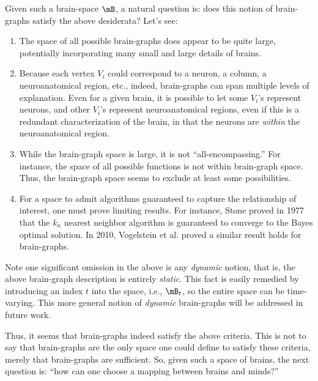Given such a brain-space $\mB$, a natural question is: does this notion of brain-graphs satisfy the above desiderata? Let's see:

\begin{enumerate}
	\item The space of all possible brain-graphs does appear to be quite large, potentially incorporating many small and large details of brains.
	\item Because each vertex $V_i$ could correspond to a neuron, a column, a neuroanatomical region, etc., indeed, brain-graphs can span multiple levels of explanation.  Even for a given brain, it is possible to let some $V_i$'s represent neurons, and other $V_i$'s represent neuroanatomical regions, even if this is a redundant characterization of the brain, in that the neurons are \emph{within} the neuroanatomical region.
	\item While the brain-graph space is large, it is not ``all-encompassing.''  For instance, the space of all possible functions is not within brain-graph space. Thus, the brain-graph space seems to exclude at least some possibilities.
	\item For a space to admit algorithms guaranteed to capture the relationship of interest, one must prove limiting results.  For instance, Stone proved in 1977 \cite{Stone77} that the $k_n$ nearest neighbor algorithm is guaranteed to converge to the Bayes optimal solution.  In 2010, Vogelstein et al. \cite{VogelsteinPriebe10} proved a similar result holds for brain-graphs.
\end{enumerate}

Note one significant omission in the above is any \emph{dynamic} notion, that is, the above brain-graph description is entirely \emph{static}\cite{?}.  This fact is easily remedied by introducing an index $t$ into the space, i.e., $\mB_t$, so the entire space can be time-varying.  This more general notion of \emph{dynamic} brain-graphs will be addressed in future work.

Thus, it seems that brain-graphs indeed satisfy the above criteria.  This is not to say that brain-graphs are the only space one could define to satisfy these criteria, merely that brain-graphs are sufficient. So, given such a space of brains, the next question is: ``how can one choose a mapping between brains and minds?''


